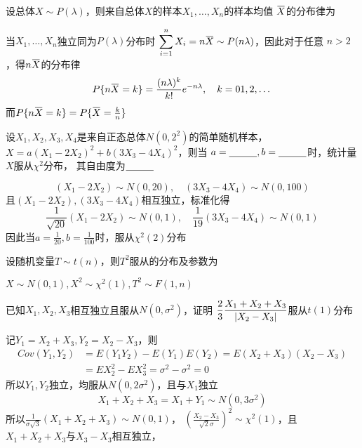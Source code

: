 \documentclass{article}
\begin{document}
\begin{examplle}[]
设总体\(X\sim P(\lambda)\)，则来自总体\(X\)的样本\(X_1,\dots,X_n\)的样本均值
\(\bbar{X}\)的分布律为

当\(X_1,\dots,X_n\)独立同为\(P(\lambda)\)分布时
\(\displaystyle\sum_{i=1}^nX_i=n\bbar{X}\sim P(n\lambda)\)，因此对于任意
\(n>2\)，得\(n\bbar{X}\)的分布律
\begin{equation*}
P\{n\bbar{X}=k\}=\frac{(n\lambda)^k}{k!}e^{-n\lambda},\quad
k=01,2,\dots
\end{equation*}
而\(P\{n\bbar{X}=k\}=P\{\bbar{X}=\frac{k}{n}\}\)
\end{examplle}

\begin{examplle}[]
设\(X_1,X_2,X_3,X_4\)是来自正态总体\(N(0,2^2)\)的简单随机样本，
\(X=a(X_1-2X_2)^2+b(3X_3-4X_4)^2\)，则当
\(a=\underline{\hspace{1cm}},b=\underline{\hspace{1cm}}\)时，统计量\(X\)服从\(\chi^2\)分布，
其自由度为\(\underline{\hspace{1cm}}\)

\begin{equation*}
(X_1-2X_2)\sim N(0,20),\quad(3X_3-4X_4)\sim N(0,100)
\end{equation*}
且\((X_1-2X_2),(3X_3-4X_4)\)相互独立，标准化得
\begin{equation*}
\frac{1}{\sqrt{20}}(X_1-2X_2)\sim N(0,1),\quad
\frac{1}{19}(3X_3-4X_4)\sim N(0,1)
\end{equation*}
因此当\(a=\frac{1}{20},b=\frac{1}{100}\)时，服从\(\chi^2(2)\)分布
\end{examplle}

\begin{examplle}[]
设随机变量\(T\sim t(n)\)，则\(T^2\)服从的分布及参数为

\(X\sim N(0,1),X^2\sim\chi^2(1),T^2\sim F(1,n)\)
\end{examplle}

\begin{examplle}[]
已知\(X_1,X_2,X_3\)相互独立且服从\(N(0,\sigma^2)\)，证明
\(\displaystyle\frac{2}{3}\frac{X_1+X_2+X_3}{\abs{X_2-X_3}}\)服从\(t(1)\)分布

记\(Y_1=X_2+X_3,Y_2=X_2-X_3\)，则
\begin{align*}
Cov(Y_1,Y_2)&=
E(Y_1Y_2)-E(Y_1)E(Y_2)=E(X_2+X_3)(X_2-X_3)\\
&=EX_2^2-EX_3^2=\sigma^2-\sigma^2=0
\end{align*}
所以\(Y_1,Y_2\)独立，均服从\(N(0,2\sigma^2)\)，且与\(X_1\)独立
\begin{equation*}
X_1+X_2+X_3=X_1+Y_1\sim N(0,3\sigma^2)
\end{equation*}
所以\(\displaystyle\frac{1}{\sigma\sqrt{3}}(X_1+X_2+X_3)\sim N(0,1)\)，
\(\displaystyle\left(\frac{X_2-X_3}{\sqrt{2}\sigma}\right)^2\sim\chi^2(1)\)，且
\(X_1+X_2+X_3\)与\(X_3-X_3\)相互独立，
\end{examplle}
\end{document}
